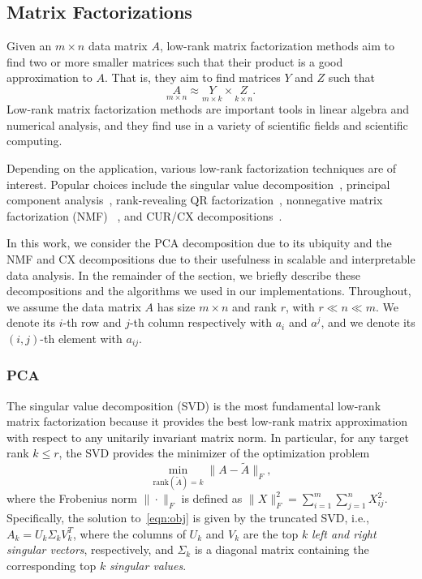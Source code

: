 
\subsection{Matrix Factorizations}

Given an $m \times n$ data matrix $A$, low-rank matrix factorization methods aim to find two or more smaller matrices such that their product is a good approximation to $A$.
That is, they aim to find matrices $Y$ and $Z$ such that
\begin{equation*}
 \label{eqn:apprx}
    \underset{m\times n}{A} \approx \underset{m\times k}{Y} \times \underset{k\times n}{Z}. 
\end{equation*}
Low-rank matrix factorization methods are important tools in linear algebra and numerical analysis, and they find use in a variety of scientific fields and scientific computing.

Depending on the application, various low-rank factorization techniques are of interest. Popular choices include the singular value decomposition~\cite{GVL96}, principal component analysis~\cite{pcaBook}, rank-revealing QR factorization~\cite{GE96}, nonnegative matrix factorization (NMF) ~\cite{NMFalg}, and CUR/CX decompositions~\cite{CUR_PNAS}.

In this work, we consider the PCA decomposition due to its ubiquity and the NMF and CX decompositions due to their usefulness in scalable and interpretable data analysis. In the remainder of the section, we briefly describe these decompositions and the algorithms we used in our implementations.
Throughout, we assume the data matrix $A$ has size $m \times n$ and rank $r$, with $r \ll n \ll m.$ We denote its $i$-th row and $j$-th column respectively with $a_i$ and $a^j$, and we denote its $(i,j)$-th element with $a_{ij}.$

\subsubsection{PCA} 
The singular value decomposition (SVD) is the most fundamental low-rank matrix factorization because it provides the best low-rank matrix approximation with respect to any unitarily invariant matrix norm.
In particular, for any target rank $k \leq r$, the SVD provides the minimizer of the optimization problem
\begin{equation}
 \label{eqn:obj}
  \min_{\text{rank}(\tilde A) = k} \| A - \tilde A \|_F,
\end{equation}
where the Frobenius norm $\| \cdot \|_F$ is defined as $\|X\|_F^2 =
\sum_{i=1}^m \sum_{j=1}^n X_{ij}^2 $. Specifically, the solution
to~\eqref{eqn:obj} is given by the truncated SVD, i.e., $A_k = U_k \Sigma_k
V_k^T$, where the columns of $U_k$ and $V_k$ are the top $k$ {\it left and right singular vectors}, respectively, and $\Sigma_k$ is a 
diagonal matrix containing the corresponding top $k$ {\it singular values}.

